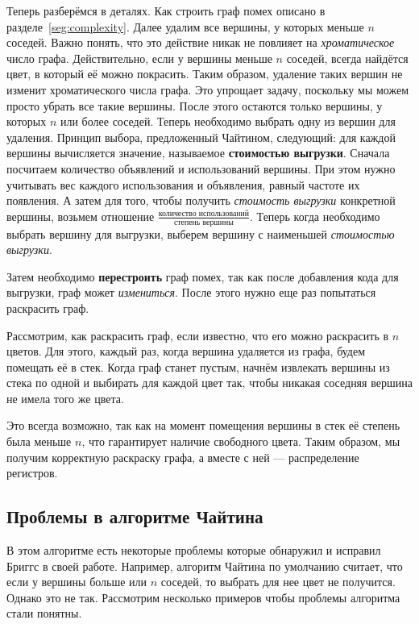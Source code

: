 \documentclass[12pt]{article}
\begin{document}
Теперь разберёмся в деталях. Как строить граф помех описано в разделе~\ref{seg:complexity}. Далее удалим все вершины, у
которых меньше $n$ соседей. Важно понять, что это действие никак не повлияет на \textit{хроматическое} число графа. Действительно,
если у вершины меньше $n$ соседей, всегда найдётся цвет, в который её можно покрасить. Таким образом, удаление таких вершин
не изменит хроматического числа графа. Это упрощает задачу, поскольку мы можем просто убрать все такие вершины. После этого
остаются только вершины, у которых $n$ или более соседей. Теперь необходимо выбрать одну из вершин для удаления. Принцип выбора,
предложенный Чайтином, следующий: для каждой вершины вычисляется значение, называемое \textbf{стоимостью выгрузки}. Сначала посчитаем количество
объявлений и использований вершины. При этом нужно учитывать вес каждого использования и объявления, равный частоте их появления.
А затем для того, чтобы получить \textit{стоимость выгрузки} конкретной вершины, возьмем отношение
$\frac{\textit{количество использований}}{\textit{степень вершины}}$. Теперь когда необходимо выбрать вершину для выгрузки,
выберем вершину с наименьшей \textit{стоимостью выгрузки}.

Затем необходимо \textbf{перестроить} граф помех, так как после добавления кода для выгрузки, граф может \textit{измениться}. После этого нужно
еще раз попытаться раскрасить граф.

Рассмотрим, как раскрасить граф, если известно, что его можно раскрасить в $n$ цветов. Для этого, каждый раз, когда вершина
удаляется из графа, будем помещать её в стек. Когда граф станет пустым, начнём извлекать вершины из стека по одной и выбирать
для каждой цвет так, чтобы никакая соседняя вершина не имела того же цвета. 

Это всегда возможно, так как на момент помещения вершины в стек её степень была меньше $n$, что гарантирует наличие свободного
цвета. Таким образом, мы получим корректную раскраску графа, а вместе с ней — распределение регистров.

\subsection{Проблемы в алгоритме Чайтина}

В этом алгоритме есть некоторые проблемы которые обнаружил и исправил Бриггс в своей работе.
Например, алгоритм Чайтина по умолчанию считает, что если у вершины больше или $n$ соседей,
то выбрать для нее цвет не получится. Однако это не так. 
Рассмотрим несколько примеров чтобы проблемы алгоритма стали понятны.
\end{document}
